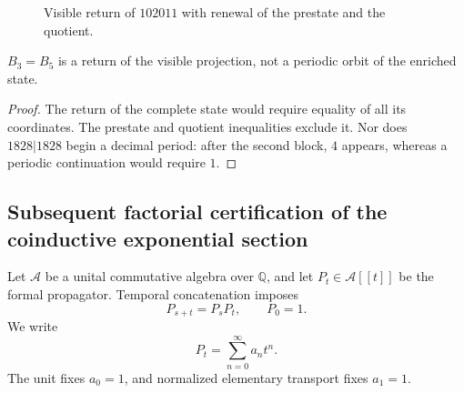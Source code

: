 \begin{figure}[htbp]
\centering
{}
\caption{Visible return of \(102011\) with renewal of the prestate and the
quotient.}
\label{p12-83-c9-s2:fig:ruptura-memoria-e}
\end{figure}

\begin{theorem}
\label{p12-83-c9-s2:thm:retorno-visible-no-periodico-e}
\(B_3=B_5\) is a return of the visible projection, not a periodic orbit
of the enriched state.
\end{theorem}

\begin{proof}
The return of the complete state would require equality of all its coordinates.
The prestate and quotient inequalities exclude it. Nor does
\(1828|1828\) begin a decimal period: after the second block,
\(4\) appears, whereas a periodic continuation would require \(1\).
\end{proof}

\subsection{Subsequent factorial certification of the coinductive exponential section}

Let \(\mathcal A\) be a unital commutative algebra over \(\mathbb Q\), and
let \(P_t\in\mathcal A[[t]]\) be the formal propagator. Temporal
concatenation imposes
\[
 P_{s+t}=P_sP_t,
 \qquad
 P_0=1.
\]
We write
\[
 P_t=\sum_{n=0}^{\infty}a_nt^n.
\]
The unit fixes \(a_0=1\), and normalized elementary transport fixes
\(a_1=1\).

